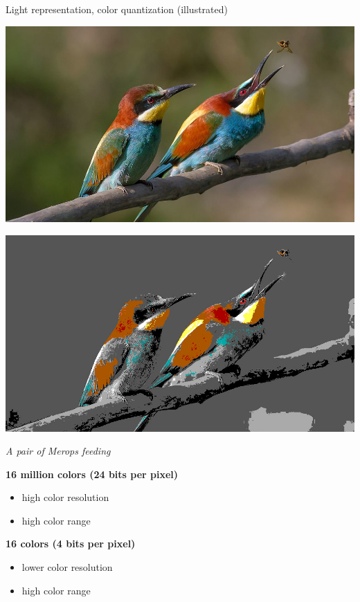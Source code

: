 \begin{frame}{Light representation, color quantization (illustrated)}
  \begin{minipage}[b]{0.45\textwidth}
    \centering
    \includegraphics[width=\textwidth]{slides/graphics-introduction/pair-of-merops.jpg}
  \end{minipage}
  \hfill
  \begin{minipage}[b]{0.45\textwidth}
    \centering
    \includegraphics[width=\textwidth]{slides/graphics-introduction/pair-of-merops-16-colors-range.jpg}
  \end{minipage}

  \begin{center}
     \textit{\small A pair of Merops feeding}
  \end{center}

  \begin{minipage}[b]{0.45\textwidth}
    \centering
    \textbf{16 million colors (24 bits per pixel)}
    \begin{itemize}
    \item high color resolution
    \item high color range
    \end{itemize}
  \end{minipage}
  \hfill
  \begin{minipage}[b]{0.45\textwidth}
    \centering
    \textbf{16 colors (4 bits per pixel)}
    \begin{itemize}
    \item lower color resolution
    \item high color range
    \end{itemize}
  \end{minipage}
\end{frame}

